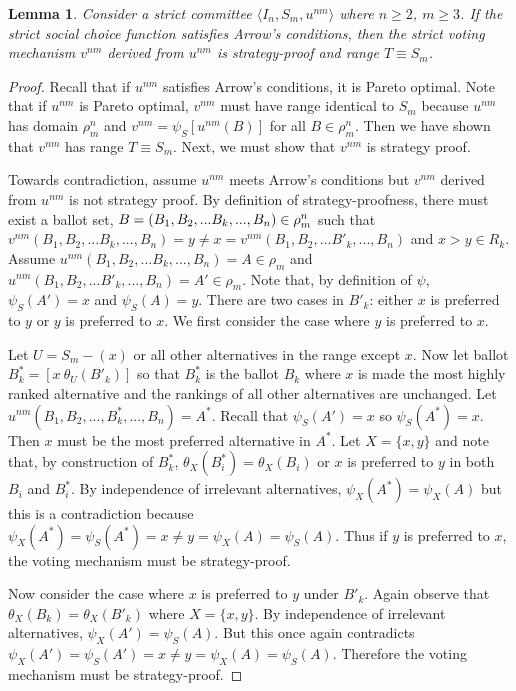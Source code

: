 \documentclass{amsart}
\newtheorem{lemma}{Lemma}
\theoremstyle{plain}
\begin{document}
\begin{lemma}
    Consider a strict committee $\langle I_n, S_m, u^{nm} \rangle$ where $n \ge 2$, $m \ge 3$. If the strict social choice function satisfies Arrow's conditions, then the strict voting mechanism $v^{nm}$ derived from $u^{nm}$ is strategy-proof and range $T \equiv S_m$.
\end{lemma}

\begin{proof}
    
Recall that if $u^{nm}$ satisfies Arrow's conditions, it is Pareto optimal. Note that if $u^{nm}$ is Pareto optimal, $v^{nm}$ must have range identical to $S_m$ because $u^{nm}$ has domain $\rho_m^n$ and $v^{nm} = \psi_S[u^{nm}(B)]$ for all $B \in \rho_m^n$. Then we have shown that $v^{nm}$ has range $T \equiv S_m$. Next, we must show that $v^{nm}$ is strategy proof. 

Towards contradiction, assume $u^{nm}$ meets Arrow's conditions but $v^{nm}$ derived from $u^{nm}$ is not strategy proof. By definition of strategy-proofness, there must exist a ballot set, $B = (B_1, B_2, ... B_k,\\ ... , B_n) \in \rho_m^n$ such that $ v^{nm}(B_1, B_2, ... B_k, ... , B_n) = y \ne x = v^{nm}(B_1, B_2, ... B'_k, ... , B_n)$ and $x > y \in R_k$. Assume $u^{nm}(B_1, B_2, ... B_k, ... , B_n) = A \in \rho_m$ and $u^{nm}(B_1, B_2, ... B'_k, ... , B_n) = A' \in \rho_m$. Note that, by definition of $\psi$, $\psi_S(A') = x$ and $\psi_S(A) = y$. There are two cases in $B'_k$: either $x$ is preferred to $y$ or $y$ is preferred to $x$. We first consider the case where $y$ is preferred to $x$. 

Let $U = S_m - (x)$ or all other alternatives in the range except $x$. Now let ballot $B^*_k = [x \: \theta_U(B'_k)]$ so that $B^*_k$ is the ballot $B_k$ where $x$ is made the most highly ranked alternative and the rankings of all other alternatives are unchanged. Let $u^{nm}(B_1, B_2, ... , B^*_k, ... , B_n) = A^*$. Recall that $\psi_S(A') = x$ so $\psi_S(A^*) = x$. Then $x$ must be the most preferred alternative in $A^*$. Let $X = \{x,y\}$ and note that, by construction of $B^*_k$, $\theta_X(B^*_i) = \theta_X(B_i)$ or $x$ is preferred to $y$ in both $B_i$ and $B^*_i$. By independence of irrelevant alternatives, $\psi_X(A^*) = \psi_X(A)$ but this is a contradiction because $\psi_X(A^*) = \psi_S(A^*) = x \ne y = \psi_X(A) = \psi_S(A)$. Thus if $y$ is preferred to $x$, the voting mechanism must be strategy-proof.

Now consider the case where $x$ is preferred to $y$ under $B'_k$. Again observe that $\theta_X(B_k) = \theta_X(B'_k)$ where $X  = \{x,y\}$. By independence of irrelevant alternatives, $\psi_X(A') = \psi_S(A)$. But this once again contradicts $\psi_X(A') = \psi_S(A') = x \ne y = \psi_X(A) = \psi_S(A)$. Therefore the voting mechanism must be strategy-proof.
\end{proof}
\end{document}
